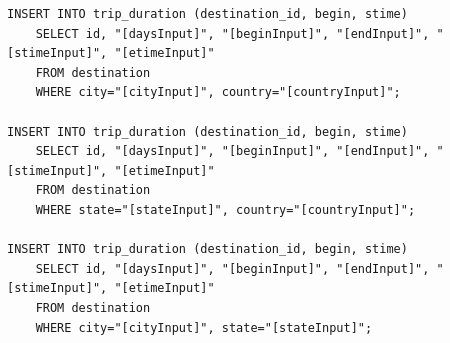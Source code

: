 \documentclass[letterpaper,10pt,onecolumn,compsoc]{IEEEtran}
\begin{document}
\begin{verbatim}
INSERT INTO trip_duration (destination_id, begin, stime) 
	SELECT id, "[daysInput]", "[beginInput]", "[endInput]", "[stimeInput]", "[etimeInput]" 
	FROM destination 
	WHERE city="[cityInput]", country="[countryInput]";
	
INSERT INTO trip_duration (destination_id, begin, stime) 
	SELECT id, "[daysInput]", "[beginInput]", "[endInput]", "[stimeInput]", "[etimeInput]" 
	FROM destination 
	WHERE state="[stateInput]", country="[countryInput]";
	
INSERT INTO trip_duration (destination_id, begin, stime) 
	SELECT id, "[daysInput]", "[beginInput]", "[endInput]", "[stimeInput]", "[etimeInput]" 
	FROM destination 
	WHERE city="[cityInput]", state="[stateInput]";	
\end{verbatim}

\newpage
\end{document}
